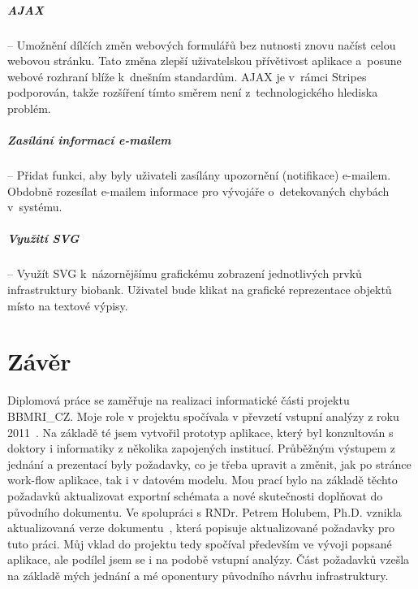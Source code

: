\documentclass[11pt,draft,oneside]{fithesis2}
\newcommand{\ProjectName}{BBMRI\_CZ\xspace}
\begin{document}
\paragraph*{AJAX} -- Umožnění dílčích změn webových formulářů bez nutnosti znovu načíst celou webovou stránku. Tato změna zlepší uživatelskou přívětivost aplikace a~posune webové rozhraní blíže k~dnešním standardům. AJAX je v~rámci Stripes podporován, takže rozšíření tímto směrem není z~technologického hlediska problém.

\paragraph*{Zasílání informací e-mailem} -- Přidat funkci, aby byly uživateli zasílány upozornění (notifikace) e-mailem. Obdobně rozesílat e-mailem informace pro vývojáře o~detekovaných chybách v~systému.

\paragraph*{Využití SVG} -- Využít SVG k~názornějšímu grafickému zobrazení jednotlivých prvků infrastruktury biobank. Uživatel bude klikat na grafické reprezentace objektů místo na textové výpisy. 










\chapter{Závěr}
Diplomová práce se zaměřuje na realizaci informatické části projektu \ProjectName. Moje role v projektu spočívala v převzetí vstupní analýzy z roku 2011~\cite{ARCH_2011_12_29}. Na základě té jsem vytvořil prototyp aplikace, který byl konzultován s doktory i informatiky z několika zapojených institucí. Průběžným výstupem z jednání a prezentací byly požadavky, co je třeba upravit a změnit, jak po stránce work-flow aplikace, tak i v datovém modelu. Mou prací bylo na základě těchto požadavků aktualizovat exportní schémata a nové skutečnosti doplňovat do původního dokumentu. Ve spolupráci s RNDr. Petrem Holubem, Ph.D. vznikla aktualizovaná verze dokumentu~\cite{ARCH_2014_1_25}, která popisuje aktualizované požadavky pro tuto práci. Můj vklad do projektu tedy spočíval především ve vývoji popsané aplikace, ale podílel jsem se i na podobě vstupní analýzy. Část požadavků vzešla na základě mých jednání a mé oponentury původního návrhu infrastruktury.
\end{document}
